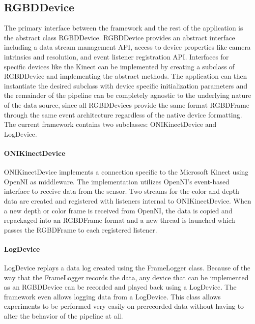 \subsection{RGBDDevice}
The primary interface between the framework and the rest of the application is the abstract class RGBDDevice. RGBDDevice provides an abstract interface including a data stream management API, access to device properties like camera intrinsics and resolution, and event listener registration API. Interfaces for specific devices like the Kinect can be implemented by creating a subclass of RGBDDevice and implementing the abstract methods. The application can then instantiate the desired subclass with device specific initialization parameters and the remainder of the pipeline can be completely agnostic to the underlying nature of the data source, since all RGBDDevices provide the same format RGBDFrame through the same event architecture regardless of the native device formatting. The current framework contains two subclasses: ONIKinectDevice and LogDevice. 
\paragraph{ONIKinectDevice} ONIKinectDevice implements a connection specific to the Microsoft Kinect using OpenNI as middleware. The implementation utilizes OpenNI's event-based interface to receive data from the sensor. Two streams for the color and depth data are created and registered with listeners internal to ONIKinectDevice. When a new depth or color frame is received from OpenNI, the data is copied and repackaged into an RGBDFrame format and a new thread is launched which passes the RGBDFrame to each registered listener. 
\paragraph{LogDevice} LogDevice replays a data log created using the FrameLogger class. Because of the way that the FrameLogger records the data, any device that can be implemented as an RGBDDevice can be recorded and played back using a LogDevice. The framework even allows logging data from a LogDevice. This class allows experiments to be performed very easily on prerecorded data without having to alter the behavior of the pipeline at all.
